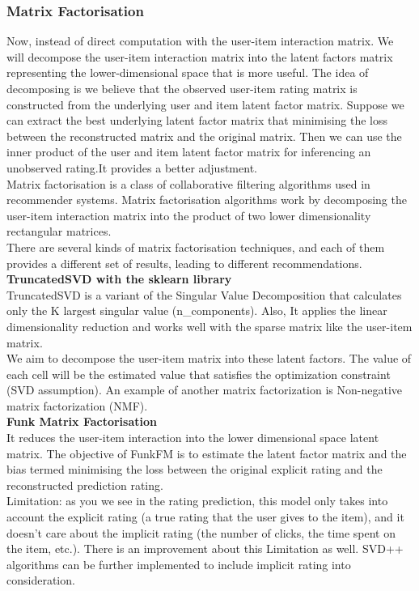 \subsubsection{Matrix Factorisation}
\label{Matrix Factorisation}
\label{MatrixFac}
Now, instead of direct computation with the user-item interaction matrix. We will decompose the user-item interaction matrix into the latent factors matrix representing the lower-dimensional space that is more useful. The idea of decomposing is we believe that the observed user-item rating matrix is constructed from the underlying user and item latent factor matrix. Suppose we can extract the best underlying latent factor matrix that minimising the loss between the reconstructed matrix and the original matrix. 
Then we can use the inner product of the user and item latent factor matrix for inferencing an unobserved rating.It provides a better  adjustment.
\\Matrix factorisation is a class of collaborative filtering algorithms used in recommender systems. Matrix factorisation algorithms work by decomposing the user-item interaction matrix into the product of two lower dimensionality rectangular matrices.
\\There are several kinds of matrix factorisation techniques, and each of them provides a different set of results, leading to different recommendations.
\\ \textbf{TruncatedSVD with the sklearn library}
\\TruncatedSVD is a variant of the Singular Value Decomposition that calculates only the K largest singular value (n\_components). Also, It applies the linear dimensionality reduction and works well with the sparse matrix like the user-item matrix.
\\We aim to decompose the user-item matrix into these latent factors. The value of each cell will be the estimated value that satisfies the optimization constraint (SVD assumption). An example of another matrix factorization is Non-negative matrix factorization (NMF).
\\ \textbf{Funk Matrix Factorisation}
\\It reduces the user-item interaction into the lower dimensional space latent matrix. The objective of FunkFM is to estimate the latent factor matrix and the bias termed minimising the loss between the original explicit rating and the reconstructed prediction rating.
\\ Limitation: as you we see in the rating prediction, this model only takes into account the explicit rating (a true rating that the user gives to the item), and it doesn't care about the implicit rating (the number of clicks, the time spent on the item, etc.). There is an improvement about this Limitation as well. SVD++ algorithms can be further implemented to include implicit rating into consideration.
